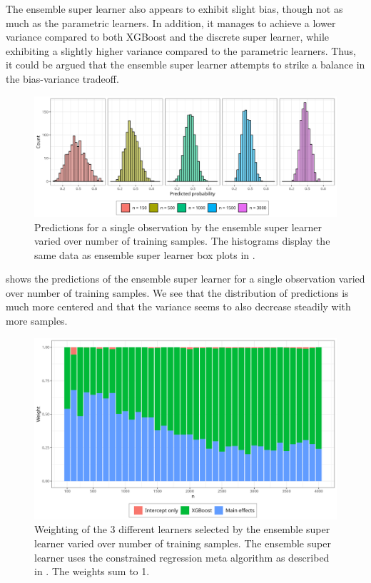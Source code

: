 \documentclass[./main.tex]{subfiles}
\begin{document}
The ensemble super learner also appears to exhibit slight bias, though not as much as the parametric learners. In addition, it manages to achieve a lower variance compared to both XGBoost and the discrete super learner, while exhibiting a slightly higher variance compared to the parametric learners. Thus, it could be argued that the ensemble super learner attempts to strike a balance in the bias-variance tradeoff.
\begin{figure}[H]
    \centering
    \includegraphics[width=\textwidth]{figures/hist_esl_dist.png}
    \caption{Predictions for a single observation by the ensemble super learner varied over number of training samples. The histograms display the same data as ensemble super learner box plots in .}
    \label{fig:hist_esl_dist}
\end{figure}
 shows the predictions of the ensemble super learner for a single observation varied over number of training samples. We see that the distribution of predictions is much more centered and that the variance seems to also decrease steadily with more samples. 
\begin{figure}[H]
    \centering
    \includegraphics[width=\textwidth]{figures/esl_weights.png}
    \caption{Weighting of the 3 different learners selected by the ensemble super learner varied over number of training samples. The ensemble super learner uses the constrained regression meta algorithm as described in . The weights sum to 1.}
    \label{fig:esl_weights}
\end{figure}
\end{document}
